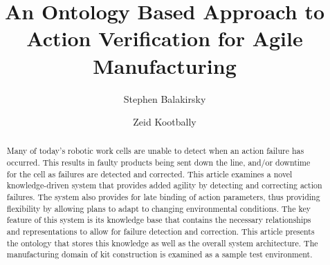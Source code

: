 \documentclass{llncs}
\begin{document}
%
\frontmatter          %
%
\pagestyle{headings}  %
%
%
\mainmatter              %
%
\title{An Ontology Based Approach to Action Verification for Agile Manufacturing}
%
%
\author{Stephen Balakirsky \and Zeid Kootbally}
%
%
%

\maketitle              %

\begin{abstract}
Many of today's robotic work cells are unable to detect when an action failure has occurred. This results in faulty products being sent down the line, and/or downtime for the cell as failures are detected and corrected. This article examines a novel knowledge-driven system that provides added agility by detecting and correcting action failures. The system also provides for late binding of action parameters, thus providing flexibility by allowing plans to adapt to changing environmental conditions. The key feature of this system is its knowledge base that contains the necessary relationships and representations to allow for failure detection and correction. This article presents the ontology that stores this knowledge as well as the overall system architecture. The manufacturing domain of kit construction is examined as a sample test environment. 
\end{abstract}
%
%





%
%



%
%


\clearpage
{} %
\renewcommand{\indexname}{Author Index}
\printindex
\clearpage
{} %
\renewcommand{\indexname}{Subject Index}
%
\end{document}
